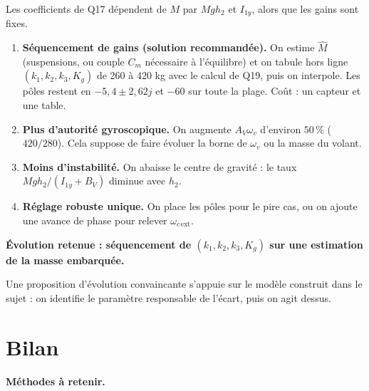 \documentclass[11pt,a4paper]{article}
\providecommand{\tightlist}{\setlength{\itemsep}{0pt}\setlength{\parskip}{0pt}}
\begin{document}
Les coefficients de Q17 dépendent de \(M\) par \(Mgh_2\) et \(I_{1y}\), alors que les gains sont fixes.

\begin{enumerate}
\def\labelenumi{\arabic{enumi}.}
\tightlist
\item
  \textbf{Séquencement de gains (solution recommandée).} On estime \(\hat M\) (suspensions, ou couple \(C_m\) nécessaire à l'équilibre) et on tabule hors ligne \((k_1,k_2,k_3,K_g)\) de 260 à 420 kg avec le calcul de Q19, puis on interpole. Les pôles restent en \(-5{,}4\pm2{,}62j\) et \(-60\) sur toute la plage. Coût : un capteur et une table.
\item
  \textbf{Plus d'autorité gyroscopique.} On augmente \(A_V\omega_v\) d'environ \(50\,\%\) (\(420/280\)). Cela suppose de faire évoluer la borne de \(\omega_v\) ou la masse du volant.
\item
  \textbf{Moins d'instabilité.} On abaisse le centre de gravité : le taux \(Mgh_2/(I_{1y}+B_V)\) diminue avec \(h_2\).
\item
  \textbf{Réglage robuste unique.} On place les pôles pour le pire cas, ou on ajoute une avance de phase pour relever \(\omega_{c\,\text{ext}}\).
\end{enumerate}

\textbf{Évolution retenue : séquencement de \((k_1,k_2,k_3,K_g)\) sur une estimation de la masse embarquée.}

\begin{methode}

Une proposition d'évolution convaincante s'appuie sur le modèle construit dans le sujet : on identifie le paramètre responsable de l'écart, puis on agit dessus.

\end{methode}

\hypertarget{bilan}{%
\section{Bilan}\label{bilan}}

\textbf{Méthodes à retenir.}
\end{document}
